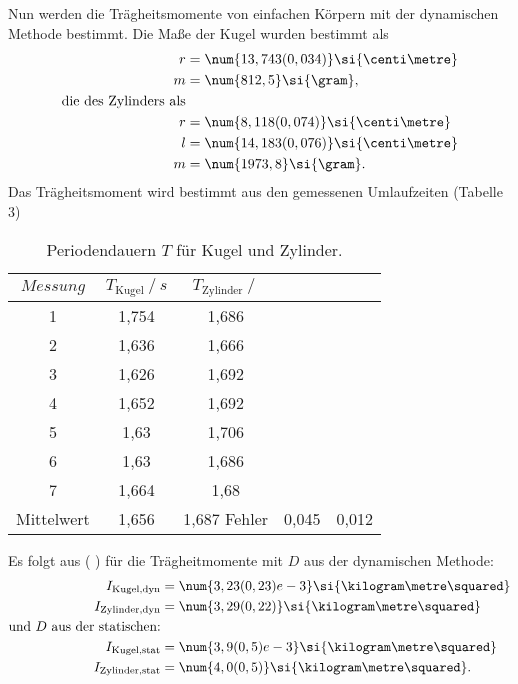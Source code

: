 Nun werden die Trägheitsmomente von einfachen Körpern mit der dynamischen Methode bestimmt.
Die Maße der Kugel wurden bestimmt als 
\begin{align*}
  r &= \num{13,743(0,034)}\si{\centi\metre}  \\
  m &= \num{812,5}\si{\gram}, \\
  \text{die des Zylinders als}\\
  r &= \num{8,118(0,074)}\si{\centi\metre} \\
  l &= \num{14,183(0,076)}\si{\centi\metre}\\
  m &= \num{1973,8}\si{\gram}.
\end{align*}
Das Trägheitsmoment wird bestimmt aus den gemessenen Umlaufzeiten (Tabelle 3)
\begin{table}
  \centering
  \caption{Periodendauern $T$ für Kugel und Zylinder.}
  \begin{tabular}{c S[table-format=1,3] S[table-format=1,3]}
    \toprule
    $Messung $  & $T_{\text{Kugel}}\:/\:s$ &$T_{\text{Zylinder}}\:/\: $ \\
    &    1,754 &     1,686\\
    2&    1,636 &     1,666\\
    3&    1,626 &     1,692\\
    4&    1,652 &     1,692\\
    5&    1,63  &     1,706\\
    6&    1,63  &     1,686\\
    7&    1,664 &     1,68 \\
    \midrule
    Mittelwert & 1,656  &1,687
    Fehler &   0,045    &0,012
    \bottomrule
  \end{tabular}
\end{table}

Es folgt aus ( ) für die Trägheitmomente mit $D$ aus der dynamischen Methode:
\begin{align*}
    I_\text{Kugel,dyn} &= \num{3,23(0,23)e-3}\si{\kilogram\metre\squared} \\
    I_\text{Zylinder,dyn} &= \num{3,29(0,22)}\si{\kilogram\metre\squared}\\
    \text{und $D$ aus der statischen:}\\
    I_\text{Kugel,stat} &= \num{3,9(0,5)e-3}\si{\kilogram\metre\squared} \\
    I_\text{Zylinder,stat} &= \num{4,0(0,5)}\si{\kilogram\metre\squared}.\\
\end{align*}

